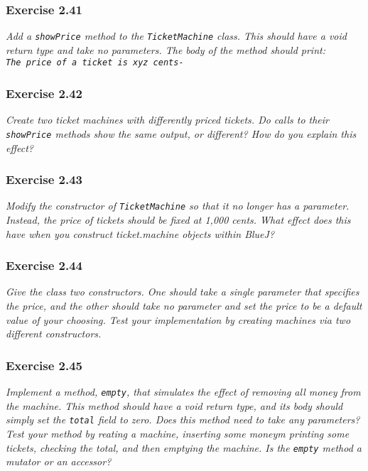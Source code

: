 \subsubsection*{Exercise 2.41}
\textit{Add a \lstinline?showPrice? method to the \lstinline?TicketMachine? 
class. This should have a void return type and take no parameters. The body of 
the method should print: \\
\lstinline?The price of a ticket is xyz cents- ?}\\

\subsubsection*{Exercise 2.42}
\textit{Create two ticket machines with differently priced tickets. Do calls 
to their \lstinline?showPrice? methods show the same output, or different? How 
do you explain this effect? }\\

\subsubsection*{Exercise 2.43}
\textit{Modify the constructor of \lstinline?TicketMachine? so that it no 
longer has a parameter. Instead, the price of tickets should be fixed at 1,000 
cents. What effect does this have when you construct ticket.machine objects 
within BlueJ? }\\

\subsubsection*{Exercise 2.44}
\textit{Give the class two constructors. One should take a single parameter 
that specifies the price, and the other should take no parameter and set the 
price to be a default value of your choosing. Test your implementation by 
creating machines via two different constructors. }\\

\subsubsection*{Exercise 2.45}
\textit{Implement a method, \lstinline?empty?, that simulates the effect of 
removing all money from the machine. This method should have a void return 
type, and its body should simply set the \lstinline?total? field to zero. Does 
this method need to take any parameters? Test your method by reating a 
machine, inserting some moneym printing some tickets, checking the total, and 
then emptying the machine. Is the \lstinline?empty? method a mutator or an 
accessor? }\\

